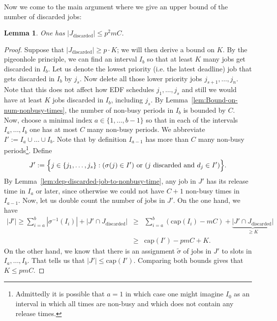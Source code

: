 \documentclass[11pt,letterpaper,oneside,english]{article}
\theoremstyle{theorem}
\newtheorem{lemma}[theorem]{Lemma}
\begin{document}
Now we come to the main argument where we give an upper bound of the
number of discarded jobs:
\begin{lemma} 
One has $|J_{\textrm{discarded}}| \leq p^2mC$.
\end{lemma}


\begin{proof}
Suppose that $|J_{\textrm{discarded}}| \geq p\cdot K$; we will
then derive
a bound on $K$.
By the pigeonhole principle, we can find an interval $I_b$
so that
at least $K$ many jobs get discarded in $I_b$.
Let us denote the lowest priority (i.e. the latest deadline) job
that gets discarded in $I_b$ by $j_s$. Now delete all those lower priority
jobs $j_{s+1},\ldots,j_n$. Note that this does not affect how EDF schedules
$j_1,\ldots,j_s$ and still we would have at least $K$ jobs discarded in
$I_b$, including $j_s$.
By Lemma~\ref{lem:Bound-on-num-nonbusy-times},
the number of non-busy periods in $I_b$
is bounded by $C$. Now, choose a minimal index $a \in \{
1,\ldots,b-1\}$ so that in
each of the
intervals $I_{a},\ldots,I_b$ one has at most $C$ many non-busy
periods.
We abbreviate $I' := I_{a} \cup \ldots \cup I_b$. Note that
by definition $I_{a-1}$ has more than $C$ many non-busy
periods\footnote{Admittedly it is possible that $a=1$ in which
case one might imagine $I_0$ as an interval in which all times are
non-busy and which does not contain any release times.}.
Define
\[
J' := \Big\{ j \in \{ j_1,\ldots,j_s\} : (\sigma(j) \in I') \textrm{ or
} \\ (j\textrm{ discarded and }d_j \in I')  \Big\}.
\]
By Lemma~\ref{lem:dep-discarded-job-to-nonbusy-time}, any job in $J'$ has
its release time in $I_a$ or later, since otherwise we could not have
$C+1$
non-busy times in $I_{a-1}$. Now, let us double count the number of
jobs in $J'$.
On the one hand, we have
\begin{eqnarray*}
   |J'| \geq \sum_{i=a}^b |\sigma^{-1}(I_i)| + |J' \cap
J_{\textrm{discarded}}| 
&\geq& \sum_{i=a}^b (\textrm{cap}(I_i) - mC) + \underbrace{|J' \cap
J_{\textrm{discarded}}|}_{\geq K} \\
&\geq& \textrm{cap}(I') - pmC + K.
\end{eqnarray*}
On the other hand, we know that there is an assignment $\tilde{\sigma}$ of jobs
in $J'$ to slots in $I_{a},\ldots,I_{b}$. That tells us that $|J'| \leq \textrm{cap}(I')$.
Comparing both bounds gives that $K \leq pmC$.
\end{proof}
\end{document}
